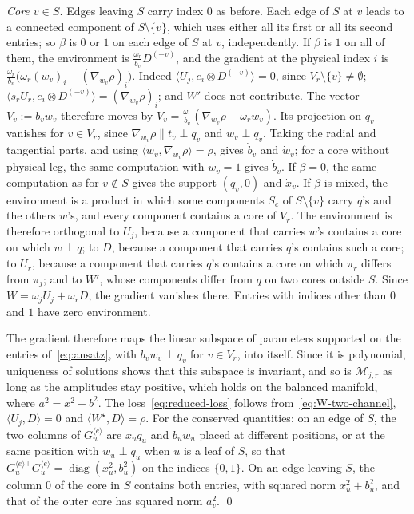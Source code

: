 \documentclass[11pt]{article}
\newcommand{\ip}[2]{\langle #1,#2\rangle}
\theoremstyle{definition}
\numberwithin{equation}{section}
\begin{document}
\emph{Core $v\in S$.} Edges leaving $S$ carry index $0$ as before. Each edge of $S$ at $v$ leads to a connected component of $S\setminus\{v\}$, which uses either all its first or all its second entries; so $\beta$ is $0$ or $1$ on each edge of $S$ at $v$, independently. If $\beta$ is $1$ on all of them, the environment is $\frac{\omega_r}{b_v}D^{(-v)}$, and the gradient at the physical index $i$ is $\frac{\omega_r}{b_v}\big(\omega_r(w_v)_i-(\nabla_{w_v}\rho)_i\big)$. Indeed $\ip{U_j}{e_i\otimes D^{(-v)}}=0$, since $V_r\setminus\{v\}\neq\emptyset$; $\ip{s_rU_r}{e_i\otimes D^{(-v)}}=(\nabla_{w_v}\rho)_i$; and $W'$ does not contribute. The vector $V_v:=b_vw_v$ therefore moves by $\dot V_v=\frac{\omega_r}{b_v}(\nabla_{w_v}\rho-\omega_rw_v)$. Its projection on $q_v$ vanishes for $v\in V_r$, since $\nabla_{w_v}\rho\parallel t_v\perp q_v$ and $w_v\perp q_v$. Taking the radial and tangential parts, and using $\ip{w_v}{\nabla_{w_v}\rho}=\rho$, gives $\dot b_v$ and $\dot w_v$; for a core without physical leg, the same computation with $w_v=1$ gives $\dot b_v$. If $\beta=0$, the same computation as for $v\notin S$ gives the support $(q_v,0)$ and $\dot x_v$. If $\beta$ is mixed, the environment is a product in which some components $S_c$ of $S\setminus\{v\}$ carry $q$'s and the others $w$'s, and every component contains a core of $V_r$. The environment is therefore orthogonal to $U_j$, because a component that carries $w$'s contains a core on which $w\perp q$; to $D$, because a component that carries $q$'s contains such a core; to $U_r$, because a component that carries $q$'s contains a core on which $\pi_r$ differs from $\pi_j$; and to $W'$, whose components differ from $q$ on two cores outside $S$. Since $W=\omega_jU_j+\omega_rD$, the gradient vanishes there. Entries with indices other than $0$ and $1$ have zero environment.

The gradient therefore maps the linear subspace of parameters supported on the entries of~\eqref{eq:ansatz}, with $b_vw_v\perp q_v$ for $v\in V_r$, into itself. Since it is polynomial, uniqueness of solutions shows that this subspace is invariant, and so is $\mathcal M_{j,r}$ as long as the amplitudes stay positive, which holds on the balanced manifold, where $a^2=x^2+b^2$. The loss~\eqref{eq:reduced-loss} follows from~\eqref{eq:W-two-channel}, $\ip{U_j}{D}=0$ and $\ip{W^\star}{D}=\rho$. For the conserved quantities: on an edge of $S$, the two columns of $G_u^{\langle e\rangle}$ are $x_uq_u$ and $b_uw_u$ placed at different positions, or at the same position with $w_u\perp q_u$ when $u$ is a leaf of $S$, so that $G_u^{\langle e\rangle\top}G_u^{\langle e\rangle}=\operatorname{diag}(x_u^2,b_u^2)$ on the indices $\{0,1\}$. On an edge leaving $S$, the column $0$ of the core in $S$ contains both entries, with squared norm $x_u^2+b_u^2$, and that of the outer core has squared norm $a_v^2$. \qed
\end{document}
